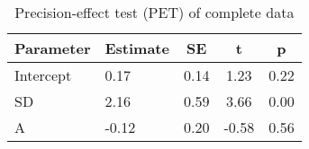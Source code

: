 \begin{table}[ht]
\centering
\caption{Precision-effect test (PET) of complete data} 
\label{tab:PET}
\begingroup\small
\begin{tabular}{llccc}
  \hline
Parameter & Estimate & SE & t & p \\ 
  \hline
Intercept & 0.17 & 0.14 & 1.23 & 0.22 \\ 
  SD & 2.16 & 0.59 & 3.66 & 0.00 \\ 
  A & -0.12 & 0.20 & -0.58 & 0.56 \\ 
  \end{tabular}
\endgroup
\end{table}
